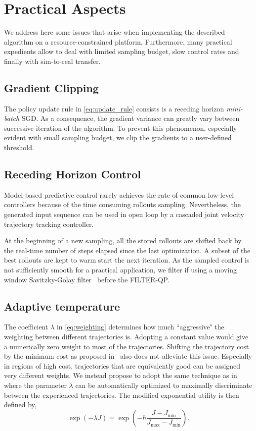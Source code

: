 \section{Practical Aspects}

We address here some issues that arise when implementing the described algorithm on a resource-constrained platform. Furthermore, many practical expedients allow to deal with limited sampling budget, slow control rates and finally with sim-to-real transfer.  

\subsection{Gradient Clipping} 
The policy update rule in \eqn \ref{eq:update_rule} consists is a receding horizon \emph{mini-batch} SGD. As a consequence, the gradient variance can greatly vary between successive iteration of the algorithm. To prevent this phenomenon, especially evident with small sampling budget, we clip the gradients to a user-defined threshold.  

\subsection{Receding Horizon Control} 
Model-based predictive control rarely achieves the rate of common low-level controllers because of the time consuming rollouts sampling. Nevertheless, the generated input sequence can be used in open loop by a cascaded joint velocity trajectory tracking controller. 

At the beginning of a new sampling, all the stored rollouts are shifted back by the real-time number of steps elapsed since the last optimization. A subset of the best rollouts are kept to warm start the next iteration. 
As the sampled control is not sufficiently smooth for a practical application, we filter if using a moving window Savitzky-Golay filter~\cite{gorry1990general} before the FILTER-QP. 

\subsection{Adaptive temperature} 
The coefficient $\lambda$ in \eqref{eq:weighting} determines how much ``aggressive" the weighting between different trajectories is. Adopting a constant value would give a numerically zero weight to most of the trajectories. Shifting the trajectory cost by the minimum cost as proposed in~\cite{williams_information_2017} also does not alleviate this issue. 
Especially in regions of high cost, trajectories that are equivalently good can be assigned very different weights. We instead propose to adopt the same technique as in~\cite{theodorou2010generalized} where the parameter $\lambda$ can be automatically optimized to maximally discriminate between the experienced trajectories. The modified exponential utility is then defined by,
\begin{equation} \label{eq:adaptive_t}
    \exp (-\lambda J ) = \exp \left( -h \frac{J - J_{\min}}{J_{\max} - J_{\min}} \right).
\end{equation}

